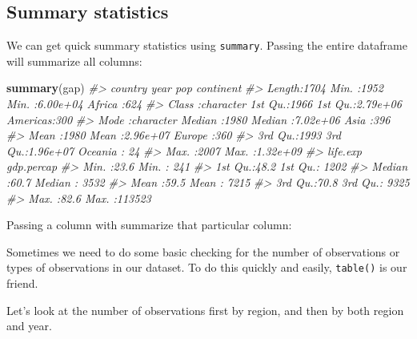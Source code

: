 \documentclass[]{book}
\newenvironment{Shaded}{\begin{snugshade}}{\end{snugshade}}
\newcommand{\KeywordTok}[1]{\textcolor[rgb]{0.13,0.29,0.53}{\textbf{#1}}}
\newcommand{\CommentTok}[1]{\textcolor[rgb]{0.56,0.35,0.01}{\textit{#1}}}
\newcommand{\OperatorTok}[1]{\textcolor[rgb]{0.81,0.36,0.00}{\textbf{#1}}}
\newcommand{\NormalTok}[1]{#1}
\begin{document}
\subsection{Summary statistics}\label{summary-statistics}

We can get quick summary statistics using \texttt{summary}. Passing the
entire dataframe will summarize all columns:

\begin{Shaded}
\begin{Highlighting}[]
\KeywordTok{summary}\NormalTok{(gap)}
\CommentTok{#>    country               year           pop              continent  }
\CommentTok{#>  Length:1704        Min.   :1952   Min.   :6.00e+04   Africa  :624  }
\CommentTok{#>  Class :character   1st Qu.:1966   1st Qu.:2.79e+06   Americas:300  }
\CommentTok{#>  Mode  :character   Median :1980   Median :7.02e+06   Asia    :396  }
\CommentTok{#>                     Mean   :1980   Mean   :2.96e+07   Europe  :360  }
\CommentTok{#>                     3rd Qu.:1993   3rd Qu.:1.96e+07   Oceania : 24  }
\CommentTok{#>                     Max.   :2007   Max.   :1.32e+09                 }
\CommentTok{#>     life.exp      gdp.percap    }
\CommentTok{#>  Min.   :23.6   Min.   :   241  }
\CommentTok{#>  1st Qu.:48.2   1st Qu.:  1202  }
\CommentTok{#>  Median :60.7   Median :  3532  }
\CommentTok{#>  Mean   :59.5   Mean   :  7215  }
\CommentTok{#>  3rd Qu.:70.8   3rd Qu.:  9325  }
\CommentTok{#>  Max.   :82.6   Max.   :113523}
\end{Highlighting}
\end{Shaded}

Passing a column with summarize that particular column:

\begin{Shaded}
\end{Shaded}

Sometimes we need to do some basic checking for the number of
observations or types of observations in our dataset. To do this quickly
and easily, \texttt{table()} is our friend.

Let's look at the number of observations first by region, and then by
both region and year.
\end{document}
